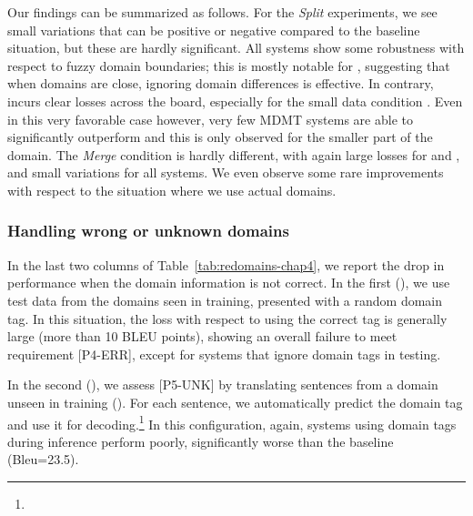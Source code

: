 Our findings can be summarized as follows. For the \textsl{Split} experiments, we see small variations that can be positive or negative compared to the baseline situation, but these are hardly significant. All systems show some robustness with respect to fuzzy domain boundaries; this is mostly notable for , suggesting that when domains are close, ignoring domain differences is effective. In contrary,  incurs clear losses across the board, especially for the small data condition \citep{Miceli17regularization}. Even in this very favorable case however, very few MDMT systems are able to significantly outperform  and this is only observed for the smaller part of the  domain. The \textsl{Merge} condition is hardly different, with again large losses for  and , and small variations for all systems. We even observe some rare improvements with respect to the situation where we use actual domains. 

\subsubsection{Handling wrong or unknown domains \label{sssec:unknowns-chap4}}

In the last two columns of Table~\ref{tab:redomains-chap4}, we report the drop in performance when the domain information is not correct. In the first (), we use test data from the domains seen in training, presented with a random domain tag. In this situation, the loss with respect to using the correct tag is generally large (more than 10 BLEU points), showing an overall failure to meet requirement [P4-ERR], except for systems that ignore domain tags in testing. 

In the second (), we assess [P5-UNK] by translating sentences from a domain unseen in training (). For each sentence, we automatically predict the domain tag and use it for decoding.\footnote{}
In this configuration, again, systems using domain tags during inference perform poorly, significantly worse than the  baseline (Bleu=23.5).

